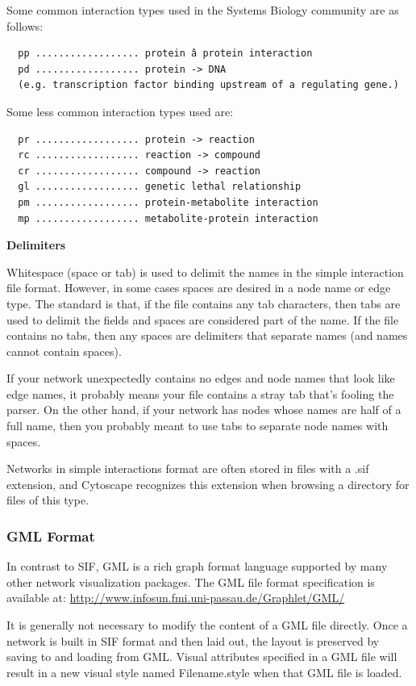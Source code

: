 Some common interaction types used in the Systems Biology community are as follows: 
\begin{verbatim}
  pp .................. protein â protein interaction
  pd .................. protein -> DNA   
  (e.g. transcription factor binding upstream of a regulating gene.)

\end{verbatim}


 Some less common interaction types used are: 
\begin{verbatim}
  pr .................. protein -> reaction
  rc .................. reaction -> compound
  cr .................. compound -> reaction
  gl .................. genetic lethal relationship
  pm .................. protein-metabolite interaction
  mp .................. metabolite-protein interaction

\end{verbatim}


\textbf{Delimiters}

Whitespace (space or tab) is used to delimit the names in the simple interaction file format. However, in some cases spaces are desired in a node name or edge type. The standard is that, if the file contains any tab characters, then tabs are used to delimit the fields and spaces are considered part of the name. If the file contains no tabs, then any spaces are delimiters that separate names (and names cannot contain spaces). 

 If your network unexpectedly contains no edges and node names that look like edge names, it probably means your file contains a stray tab that's fooling the parser. On the other hand, if your network has nodes whose names are half of a full name, then you probably meant to use tabs to separate node names with spaces. 

 Networks in simple interactions format are often stored in files with a .sif extension, and Cytoscape recognizes this extension when browsing a directory for files of this type. 

\subsubsection{GML Format}
 In contrast to SIF, GML is a rich graph format language supported by many other network visualization packages. The GML file format specification is available at: \url{http://www.infosun.fmi.uni-passau.de/Graphlet/GML/}

 It is generally not necessary to modify the content of a GML file directly. Once a network is built in SIF format and then laid out, the layout is preserved by saving to and loading from GML. Visual attributes specified in a GML file will result in a new visual style named Filename.style when that GML file is loaded. 

